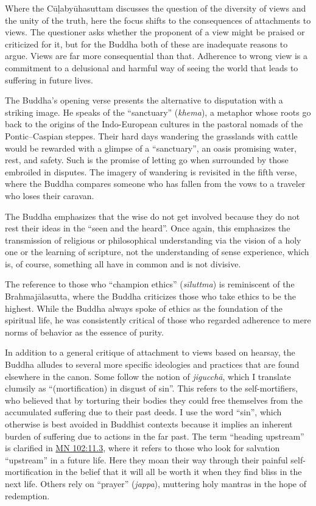 \documentclass[12pt,openany]{book}%
\begin{document}
Where the \textsanskrit{Cūḷabyūhasuttam} discusses the question of the diversity of views and the unity of the truth, here the focus shifts to the consequences of attachments to views. The questioner asks whether the proponent of a view might be praised or criticized for it, but for the Buddha both of these are inadequate reasons to argue. Views are far more consequential than that. Adherence to wrong view is a commitment to a delusional and harmful way of seeing the world that leads to suffering in future lives.

The Buddha’s opening verse presents the alternative to disputation with a striking image. He speaks of the “sanctuary” (\textit{khema}), a metaphor whose roots go back to the origins of the Indo-European cultures in the pastoral nomads of the Pontic–Caspian steppes. Their hard days wandering the grasslands with cattle would be rewarded with a glimpse of a “sanctuary”, an oasis promising water, rest, and safety. Such is the promise of letting go when surrounded by those embroiled in disputes. The imagery of wandering is revisited in the fifth verse, where the Buddha compares someone who has fallen from the vows to a traveler who loses their caravan.

The Buddha emphasizes that the wise do not get involved because they do not rest their ideas in the “seen and the heard”. Once again, this emphasizes the transmission of religious or philosophical understanding via the vision of a holy one or the learning of scripture, not the understanding of sense experience, which is, of course, something all have in common and is not divisive.

The reference to those who “champion ethics” (\textit{\textsanskrit{sīluttma}}) is reminiscent of the \textsanskrit{Brahmajālasutta}, where the Buddha criticizes those who take ethics to be the highest. While the Buddha always spoke of ethics as the foundation of the spiritual life, he was consistently critical of those who regarded adherence to mere norms of behavior as the essence of purity.

In addition to a general critique of attachment to views based on hearsay, the Buddha alludes to several more specific ideologies and practices that are found elsewhere in the canon. Some follow the notion of \textit{\textsanskrit{jigucchā}}, which I translate clumsily as “(mortification) in disgust of sin”. This refers to the self-mortifiers, who believed that by torturing their bodies they could free themselves from the accumulated suffering due to their past deeds. I use the word “sin”, which otherwise is best avoided in Buddhist contexts because it implies an inherent burden of suffering due to actions in the far past. The term “heading upstream” is clarified in \href{https://suttacentral.net/mn102/en/sujato\#11.3}{MN 102:11.3}, where it refers to those who look for salvation “upstream” in a future life. Here they moan their way through their painful self-mortification in the belief that it will all be worth it when they find bliss in the next life. Others rely on “prayer” (\textit{jappa}), muttering holy mantras in the hope of redemption.
\end{document}
